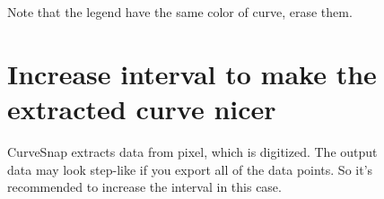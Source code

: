 \documentclass[12pt]{article}
\begin{document}
\begin{figure}[ht!]
  Note that the legend have the same color of curve, erase them.

\end{figure}

\begin{figure}[ht]
\section{Increase interval to make the extracted curve nicer}
  CurveSnap extracts data from pixel, which is digitized. The output data may look step-like if you export all of the data points. So it's recommended to increase the interval in this case.

\end{figure}
\end{document}
